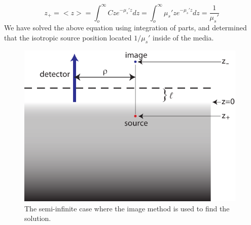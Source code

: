 \noindent
\begin{equation}
  z_+ = <z> = \int_o^\infty Cz e^{-\mu_s'z}dz =\int_o^\infty \mu_s'z
  e^{-\mu_s'z}dz = \frac{1}{\mu_s'} 
\end{equation}
\noindent
We have solved the above equation using integration of parts, and determined that the isotropic source position located $1/ \mu_s'$ inside of the media.
\noindent
\begin{figure}[h]
\begin{center}
\includegraphics[width=11cm]{./figures/semiinfinite.pdf}
\caption{The semi-infinite case where the image method is used to find the solution.}
\label{semiinf}
\end{center}
\end{figure}
